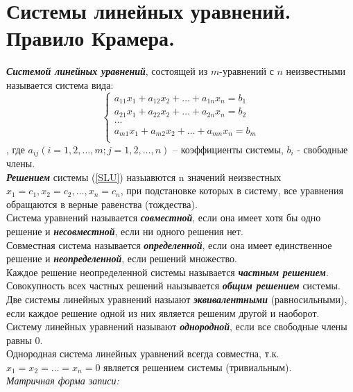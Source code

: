 \documentclass[12pt, fleqn]{article}
\begin{document}
\section{Системы линейных уравнений. Правило Крамера.}
\textbf{\textit{Системой линейных уравнений}}, состоящей из $m$-уравнений с $n$ неизвестными называется система вида:
\begin{equation}
	\label{SLU}
	\begin{cases}
		a_{11}x_1+a_{12}x_2+\dots+a_{1n}x_n=b_1\\
		a_{21}x_1+a_{22}x_2+\dots+a_{2n}x_n=b_2\\
		\dots\\
		a_{m1}x_1+a_{m2}x_2+\dots+a_{mn}x_n=b_m\\
	\end{cases}
\end{equation}, 
где $a_{ij} (i=1,2,\dots,m; j=1,2,\dots,n)$ -- коэффициенты системы, $b_i$ - свободные члены.\\
\textbf{\textit{Решением }}системы (\ref{SLU}) назыавются n значений неизвестных $x_1=c_1, x_2=c_2,\dots,x_n=c_n$, при подстановке которых в систему, все уравнения обращаются в верные равенства (тождества).\\
Система уравнений называется \textbf{\textit{совместной}}, если она имеет хотя бы одно решение и \textbf{\textit{несовместной}}, если ни одного решения нет.\\
Совместная система называется \textbf{\textit{определенной}}, если она имеет единственное решение и \textbf{\textit{неопределенной}}, если решений множество.\\
Каждое решение неопределенной системы называется \textbf{\textit{частным решением}}. Совокупность всех частных решений наызывается \textbf{\textit{общим решением }}системы.\\
Две системы линейных уравнений назыают \textbf{\textit{эквивалентными}} (равносильными), если каждое решение одной из них является решеним другой и наоборот.\\
Систему линейных уравнений называют \textbf{\textit{однородной}}, если все свободные члены равны 0.\\
Однородная система линейных уравнений всегда совместна, т.к. $x_1=x_2=\dots=x_n=0$ является решением системы (тривиальным).\\
\textit{Матричная форма записи:}
\end{document}
